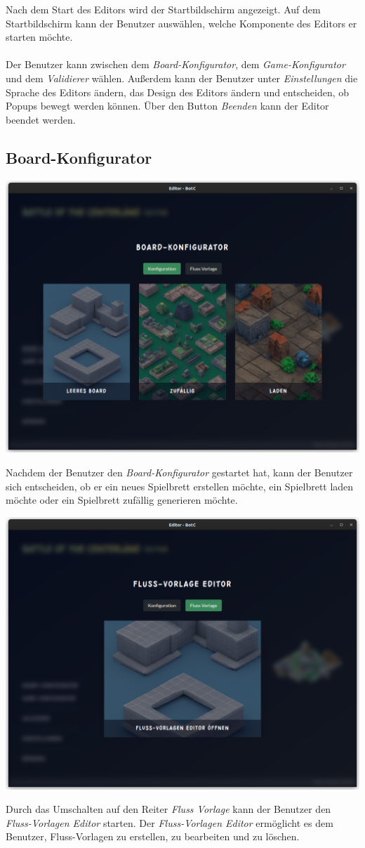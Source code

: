 \documentclass[12pt]{gruppe-11-article-a5}
\begin{document}
Nach dem Start des Editors wird der Startbildschirm angezeigt.
Auf dem Startbildschirm kann der Benutzer auswählen, welche Komponente des Editors er starten möchte.
\\\\
Der Benutzer kann zwischen dem \emph{Board-Konfigurator}, dem \emph{Game-Konfigurator} und dem \emph{Validierer} wählen.
Außerdem kann der Benutzer unter \emph{Einstellungen} die Sprache des Editors ändern, das Design des Editors ändern und entscheiden, ob Popups bewegt werden können.
Über den Button \emph{Beenden} kann der Editor beendet werden.

\subsection{Board-Konfigurator}\label{subsec:board-konfigurator}

\includegraphics[width=\textwidth]{./Handbuch/assets/Board-Konfigurator-Choice}

Nachdem der Benutzer den \emph{Board-Konfigurator} gestartet hat, kann der Benutzer sich entscheiden, ob er ein neues Spielbrett erstellen möchte, ein Spielbrett laden möchte oder ein Spielbrett zufällig generieren möchte.

\includegraphics[width=\textwidth]{./Handbuch/assets/Board-Konfigurator-Choice-River-Presets}

Durch das Umschalten auf den Reiter \emph{Fluss Vorlage} kann der Benutzer den \emph{Fluss-Vorlagen Editor} starten.
Der \emph{Fluss-Vorlagen Editor} ermöglicht es dem Benutzer, Fluss-Vorlagen zu erstellen, zu bearbeiten und zu löschen.
\end{document}
